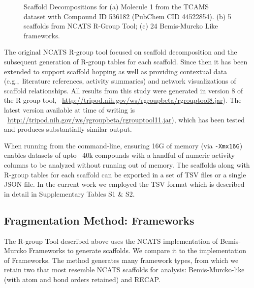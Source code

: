 \documentclass[journal=jacsat,biochem,manuscript=article]{achemso}
\newcommand*\sref[1]{Section~\ref{sec:#1}}
\newcommand*\eg{e.g.,~}
\begin{document}
\begin{figure}
\caption{Scaffold Decompositions for (a) Molecule 1 from the TCAMS dataset with Compound ID 536182 (PubChem CID 44522854). (b) 5 scaffolds from NCATS R-Group Tool; (c) 24 Bemis-Murcko Like frameworks.}
\label{fig:scafmethod}
\end{figure}


The original NCATS R-group tool focused on scaffold decomposition and
the subsequent generation of R-group tables for each scaffold. Since
then it has been extended to support scaffold hopping as well as
providing contextual data (\eg literature references, activity
summaries) and network visualizations of scaffold relationships. All
results from this study were generated in version 8 of the R-group tool,
~\url{http://tripod.nih.gov/ws/rgroupbeta/rgrouptool8.jar}). The
latest version available at time of writing is
~\url{http://tripod.nih.gov/ws/rgroupbeta/rgrouptool11.jar}), which has been
tested and produces substantially similar output.

When running from the command-line, ensuring 16G of memory (via
\texttt{-Xmx16G}) enables datasets of upto ~40k compounds with a
handful of numeric activity columns to be analyzed without running out
of memory. The scaffolds along with R-group tables for each scaffold
can be exported in a set of TSV files or a single JSON file. In the
current work we employed the TSV format which is described in detail
in Supplementary Tables S1 \& S2.

\subsection{Fragmentation Method: Frameworks}
\label{sec:gskframe}
The R-group Tool described above uses the NCATS implementation of
Bemis-Murcko Frameworks to generate scaffolds. We compare it to the
\citet{Harper2004DDclus} implementation of Frameworks.
The method generates many framework types, from which we retain two that
most resemble NCATS scaffolds for analysis: Bemis-Murcko-like\cite{BemisMurcko1996}
(with atom and bond orders retained) and RECAP\cite{Lewell:1998aa}. 


\end{document}
